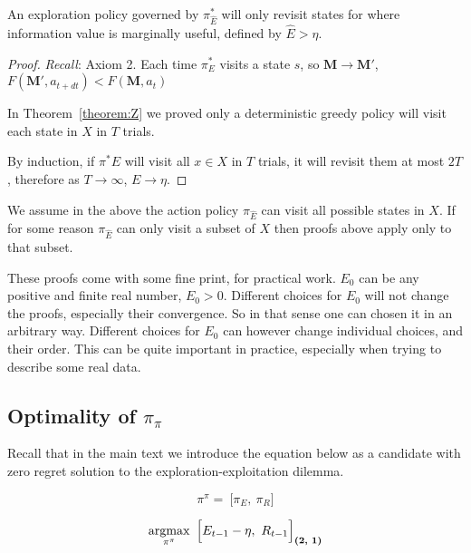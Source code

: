 \begin{theorem}[[Efficient exploration] \label{theorem:convergence} 
	An exploration policy governed by $\pi^*_{\hat E}$ will only revisit states for where information value is marginally useful, defined by $\hat E > \eta$.  
\end{theorem}
\begin{proof}
	\textit{Recall}: Axiom 2. Each time $\pi^*_E$ visits a state $s$, so $\mathbf{M} \rightarrow \mathbf{M}'$, $F(\mathbf{M}', a_{t+dt}) < F(\mathbf{M}, a_t)$
	
	In Theorem~\ref{theorem:Z} we proved only a deterministic greedy policy will visit each state in $X$ in $T$ trials.
	
	By induction, if $\pi^*E$ will visit all $x \in X$ in $T$ trials, it will revisit them at most $2T$, therefore as $T \rightarrow \infty$, $E \rightarrow \eta$. 
\end{proof}

We assume in the above the action policy $\pi_{\hat E}$ can visit all possible states in $X$. If for some reason $\pi_{\hat E}$ can only visit a subset of $X$ then proofs above apply only to that subset. 

These proofs come with some fine print, for practical work. $E_0$ can be any positive and finite real number, $E_0 > 0$. Different choices for $E_0$ will not change the proofs, especially their convergence. So in that sense one can chosen it in an arbitrary way. Different choices for $E_0$ can however change individual choices, and their order. This can be quite important in practice, especially when trying to describe some real data.  

\subsection*{Optimality of $\pi_{\pi}$} \label{sec:opt_pipi} 
Recall that in the main text we introduce the equation below as a candidate with zero regret solution to the exploration-exploitation dilemma.

\begin{equation}
\label{eq:pipi} 
\pi^{\pi} = \ \Big [ \pi_E,\ \pi_R \Big ]
\end{equation}

\begin{equation}
\label{eq:meta_greedy2} 
	\operatorname*{argmax}_{\pi^{\pi}} \ \Big [ E_{t-1} - \eta,\ R_{t-1} \Big ]_{\textbf{(2, 1)}}
\end{equation}

